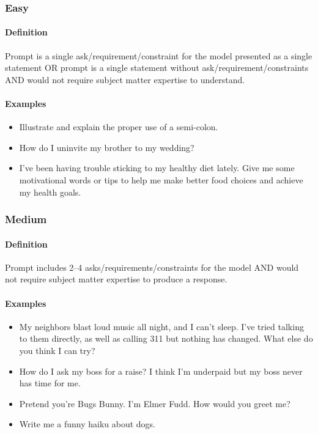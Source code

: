 \subsubsection{Easy}

\paragraph{Definition} Prompt is a single ask/requirement/constraint for the model presented as a single statement OR prompt is a single statement without ask/requirement/constraints AND would not require subject matter expertise to understand.

\paragraph{Examples}

\begin{itemize}
    \item Illustrate and explain the proper use of a semi-colon.
    \item How do I uninvite my brother to my wedding?
    \item I've been having trouble sticking to my healthy diet lately. Give me some motivational words or tips to help me make better food choices and achieve my health goals.
\end{itemize}

\subsubsection{Medium}

\paragraph{Definition} Prompt includes 2--4 asks/requirements/constraints for the model AND would not require subject matter expertise to produce a response.

\paragraph{Examples}

\begin{itemize}
    \item My neighbors blast loud music all night, and I can’t sleep. I’ve tried talking to them directly, as well as calling 311 but nothing has changed. What else do you think I can try?
    \item How do I ask my boss for a raise? I think I’m underpaid but my boss never has time for me.
    \item Pretend you’re Bugs Bunny. I’m Elmer Fudd. How would you greet me?
    \item Write me a funny haiku about dogs.
\end{itemize}

